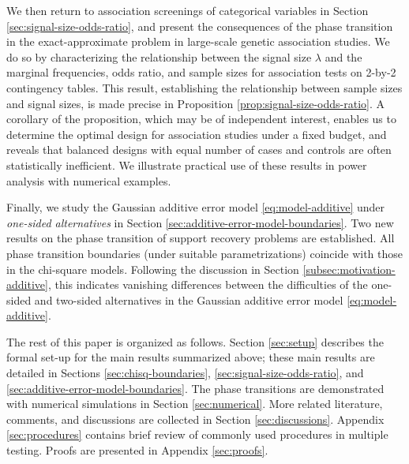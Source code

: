 We then return to association screenings of categorical variables in Section \ref{sec:signal-size-odds-ratio}, and 
present the consequences of the phase transition in the exact-approximate problem in large-scale genetic association studies.
We do so by characterizing the relationship between the signal size $\lambda$ and the marginal frequencies, odds ratio, and sample sizes for association tests on 2-by-2 contingency tables.
This result, establishing the relationship between sample sizes and signal sizes, is made precise in Proposition \ref{prop:signal-size-odds-ratio}.
A corollary of the proposition, which may be of independent interest, enables us to determine the optimal design for association studies under a fixed budget, and reveals that balanced designs with equal number of cases and controls are often statistically inefficient.
We illustrate practical use of these results in power analysis with numerical examples. 

Finally, we study the Gaussian additive error model \eqref{eq:model-additive} under \emph{one-sided alternatives} in Section \ref{sec:additive-error-model-boundaries}. 
Two new results on the phase transition of support recovery problems are established.
All phase transition boundaries (under suitable parametrizations) coincide with those in the chi-square models.
Following the discussion in Section \ref{subsec:motivation-additive}, this indicates vanishing differences between the difficulties of the one-sided and two-sided alternatives in the Gaussian additive error model \eqref{eq:model-additive}.

The rest of this paper is organized as follows. 
Section \ref{sec:setup} describes the formal set-up for the main results summarized above; these main results are detailed in Sections \ref{sec:chisq-boundaries}, \ref{sec:signal-size-odds-ratio}, and \ref{sec:additive-error-model-boundaries}. 
The phase transitions are demonstrated with numerical simulations in Section \ref{sec:numerical}.
More related literature, comments, and discussions are collected in Section \ref{sec:discussions}.
Appendix \ref{sec:procedures} contains brief review of commonly used procedures in multiple testing.
Proofs are presented in Appendix \ref{sec:proofs}.


